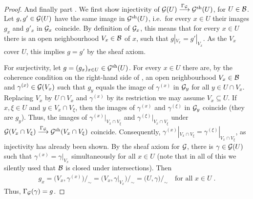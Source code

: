 \documentclass[a4paper,parskip=half,numbers=enddot, DIV=12]{scrreprt}
\begin{document}
\begin{proof}
	And finally part . We first show injectivity of $\Gg(U)\morphism[\Gamma_\Gg] \Gg^\sh(U)$, for $U\in \mathcal{B}$. Let $g,g'\in \mathcal{G}(U)$ have the same image in $\mathcal{G}^{\mathrm{sh}}(U)$, i.e.\ for every $x\in U$ their images $g_x$ and $g'_x$ in $\mathcal{G}_x$ coincide. By definition of $\mathcal{G}_x$, this means that for every $x\in U$ there is an open neighbourhood $V_x\in\mathcal{B}$ of $x$, such that $g|_{V_x}=g'|_{V_x}$. As the $V_x$ cover $U$, this implies $g=g'$ by the sheaf axiom.
	
	For surjectivity, let $g=(g_x)_{x\in U}\in \mathcal{G}^{\mathrm{sh}}(U)$. For every $x\in U$ there are, by the coherence condition on the right-hand side of , an open neighbourhood $V_x\in\mathcal{B}$ and $\gamma^{(x)}\in \mathcal{G}(V_x)$ such that $g_y$ equals the image of $\gamma^{(x)}$ in $\mathcal{G}_y$ for all $y\in U\cap V_x$. Replacing $V_x$ by $U\cap V_x$ and $\gamma^{(x)}$ by its restriction we may assume $V_x\subseteq U$. If $x,\xi\in U$ and $y\in V_x\cap V_\xi$, then the images of $\gamma^{(x)}$ and $\gamma^{(\xi)}$ in $\mathcal{G}_y$ coincide (they are $g_y$). Thus, the images of $\gamma^{(x)}|_{V_x\cap V_\xi}$ and $ \gamma^{(\xi)}|_{V_x\cap V_\xi}$ under $\Gg(V_x\cap V_\xi ) \morphism[\Gamma_\Gg] \Gg^\sh(V_x\cap V_\xi)$ coincide. Consequently,  $\gamma^{(x)}|_{V_x\cap V_\xi} = \gamma^{(\xi)}|_{V_x\cap V_\xi}$, as injectivity has already been shown. By the sheaf axiom for $\mathcal{G}$, there is $\gamma\in \mathcal{G}(U)$ such that $\gamma^{(x)}=\gamma|_{V_x}$ simultaneously for all $x\in U$ (note that in all of this we silently used that $\mathcal{B}$ is closed under intersections). Then 
	\begin{align*}
		g_x=\big(V_x, \gamma^{(x)}\big)/_\sim = \big(V_x,\gamma|_{V_x}\big)/_\sim = \big(U,\gamma\big)/_\sim\quad\text{for all }x\in U\;. 
	\end{align*}
	Thus, $\Gamma_{\mathcal{G}}(\gamma) = g$.
\end{proof}
\end{document}
